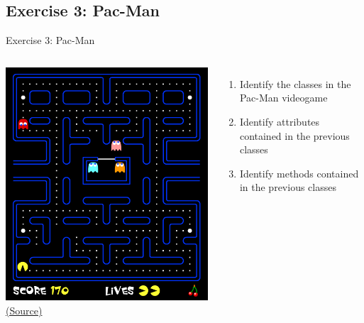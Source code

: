 \documentclass[10pt,compress]{beamer} %
\begin{document}
\subsection{Exercise 3: Pac-Man}
	\begin{frame}{Exercise 3: Pac-Man}
    \begin{columns}
		\centering \includegraphics[width=\linewidth]{figs/pacman2.png}\\
		\tiny{\href{http://gamedevelopment.tutsplus.com/tutorials/quick-tip-intro-to-object-oriented-programming-for-game-development--gamedev-1805}{(Source)}}
	\begin{enumerate}
	\item Identify the classes in the Pac-Man videogame
	\item Identify attributes contained in the previous classes
	\item Identify methods contained in the previous classes
	\end{enumerate}
	\end{columns}
\end{frame}
\end{document}
